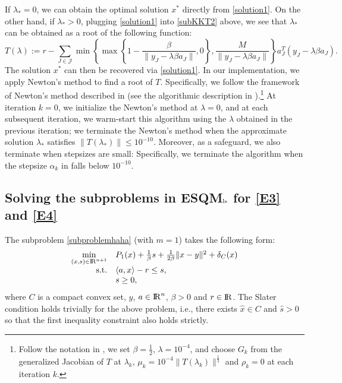 \documentclass[10pt]{article}
\numberwithin{equation}{section}
\def\R{{\rm I\!R}}
\begin{document}
If $\lambda_* = 0$, we can obtain the optimal solution $x^*$ directly from \eqref{solution1}. On the other hand, if $\lambda_* > 0$, plugging \eqref{solution1} into \eqref{subKKT2} above, we see that $\lambda_*$ can be obtained as a root of the following function:
\begin{equation}\label{G}
T(\lambda) := r- \sum_{J\in\mathcal{J}} \min\left\{\max\left\{1 - \frac{\beta}{\|y_J - \lambda\beta a_J\|}, 0\right\},\frac{M}{\|y_J - \lambda\beta a_J\|}\right\}a_J^T(y_J - \lambda\beta a_J).
\end{equation}
The solution $x^*$ can then be recovered via \eqref{solution1}. In our implementation, we apply Newton's method to find a root of $T$. Specifically, we follow the framework of Newton's method described in \cite{SoSv98} (see the algorithmic description in \cite[Algorithm~2.1]{SoSv98}).\footnote{Follow the notation in \cite[Algorithm~2.1]{SoSv98}, we set $\beta = \frac{1}{2}$, $\lambda = 10^{-4}$, and choose $G_k$ from the generalized Jacobian of $T$ at $\lambda_k$, $\mu_k = 10^{-4}\|T(\lambda_k)\|^{\frac{1}{2}}$ and $\rho_k = 0$ at each iteration $k$.} At iteration $k = 0$, we initialize the Newton's method at $\lambda = 0$, and at each subsequent iteration, we warm-start this algorithm using the $\lambda$ obtained in the previous iteration; we terminate the Newton's method when the approximate solution $\lambda_*$ satisfies $\|T(\lambda_*)\| \le 10^{-10}$. Moreover, as a safeguard, we also terminate when stepsizes are small: Specifically, we terminate the algorithm when the stepsize $\alpha_k$ in \cite[Algorithm~2.1]{SoSv98} falls below $10^{-10}$.


\subsection{Solving the subproblems in ESQM$_{\rm ls}$ for \eqref{E3} and \eqref{E4}}
The subproblem \eqref{subproblemhaha} (with $m = 1$) takes the following form:
\begin{equation}\label{solvsub1}
  \begin{array}{rl}
\min\limits_{(x,s)\in\R^{n+1}} & P_1(x) + \frac{1}{\beta} s + \frac{1}{2\beta}\|x - y\|^2 + \delta_{C}(x)\\
{\rm s.t.} & \langle a, x\rangle - r \leq s,\\
& s \geq 0,
  \end{array}
\end{equation}
where $C$ is a compact convex set, $y$, $a\in\R^n$, $\beta >0$ and $r\in \R$. The Slater condition holds trivially for the above problem, i.e., there exists $\hat x \in C$ and $\hat s > 0$ so that the first inequality constraint also holds strictly.
\end{document}

